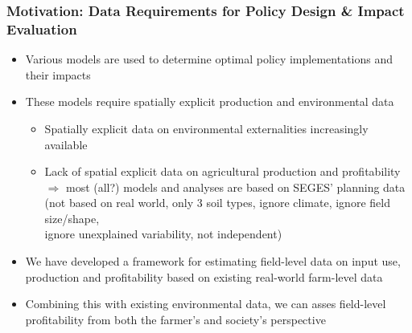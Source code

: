 \documentclass[t,24pt,aspectratio=169]{beamer}
\begin{document}
\begin{frame}[hvid]
\frametitle{\vspace{-3ex}Motivation: Data Requirements for Policy Design \& Impact Evaluation}

\begin{itemize}
\setlength{\itemsep}{1.5ex}
\item Various models are used to determine optimal policy implementations and their impacts  
\item These models require spatially explicit production and environmental data
\begin{itemize}
\setlength{\itemsep}{1ex}
\item Spatially explicit data on environmental externalities increasingly available
\item Lack of spatial explicit data on agricultural production and profitability\\
    $\Rightarrow$ most (all?) models and analyses are based on SEGES' planning data\\
    \quad (not based on real world, only 3 soil types, ignore climate, ignore field size/shape,\\
    \quad ignore unexplained variability, not independent)
\end{itemize}

\item We have developed a framework for estimating field-level data on input use, production and profitability based on existing real-world farm-level data

\item Combining this with existing environmental data,
we can asses field-level profitability from both the farmer's and society's perspective 
\end{itemize}
\end{frame}
\end{document}
